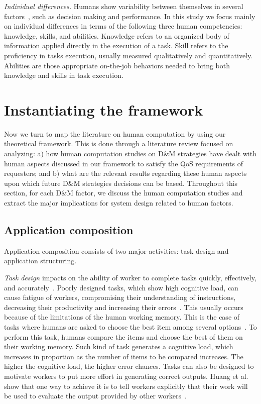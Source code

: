 \documentclass[11pt]{bmc_article_s50}
\begin{document}
\textit{Individual differences.} Humans show variability between themselves in several factors~\cite{Parasuraman:2012,Stanovich:1998}, such as decision making and performance. In this study we focus mainly on individual differences in terms of the following three human competencies: knowledge, skills, and abilities. Knowledge refers to an organized body of information applied directly in the execution of a task. Skill refers to the proficiency in tasks execution, usually measured qualitatively and quantitatively. Abilities are those appropriate on-the-job behaviors needed to bring both knowledge and skills in task execution.

\section{Instantiating the framework}

Now we turn to map the literature on human computation by using our theoretical framework. This is done through a literature review focused on analyzing: a) how human computation studies on D\&M strategies have dealt with human aspects discussed in our framework to satisfy the QoS requirements of requesters; and b) what are the relevant results regarding these human aspects upon which future D\&M strategies decisions can be based. Throughout this section, for each D\&M factor, we discuss the human computation studies and extract the major implications for system design related to human factors.

\subsection{Application composition}
\label{subsubsec:composition}

Application composition consists of two major activities: task design and application structuring.

\textit{Task design} impacts on the ability of worker to complete tasks quickly, effectively, and accurately~\cite{Khanna:2010}. Poorly designed tasks, which show high cognitive load, can cause fatigue of workers, compromising their understanding of instructions, decreasing their productivity and increasing their errors~\cite{Kulkarni2012}. This usually occurs because of the limitations of the human working memory. This is the case of tasks where humans are asked to choose the best item among several options~\cite{Sun:Hcomp:2011,Venetis:2012}. To perform this task, humans compare the items and choose the best of them on their working memory. Such kind of task generates a cognitive load, which increases in proportion as the number of items to be compared increases. The higher the cognitive load, the higher error chances. {\color{black} Tasks can also be designed to motivate workers to put more effort in generating correct outputs. Huang et al. show that one way to achieve it is to tell workers  explicitly that their work will be used to evaluate the output provided by other workers~\cite{Huang:2013}.}
\end{document}
